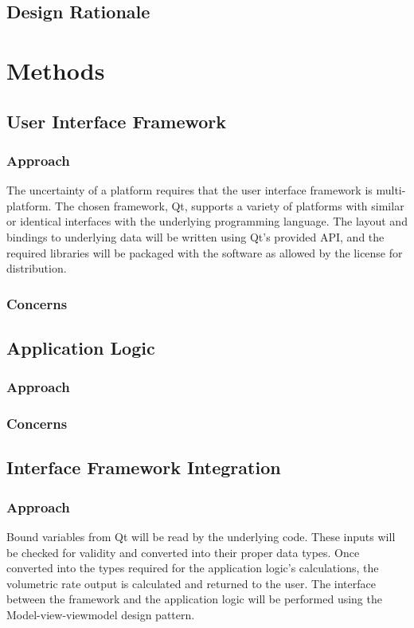 \documentclass[onecolumn, draftclsnofoot,10pt, compsoc]{IEEEtran}
\begin{document}
\subsection{Design Rationale}

\section{Methods}
\subsection{User Interface Framework}
\subsubsection{Approach}
The uncertainty of a platform requires that the user interface framework is multi-platform.
The chosen framework, Qt, supports a variety of platforms with similar or identical interfaces with the underlying programming language.
The layout and bindings to underlying data will be written using Qt's provided API, and the required libraries will be packaged with the software as allowed by the license for distribution. 
\subsubsection{Concerns}

\subsection{Application Logic}
\subsubsection{Approach}

\subsubsection{Concerns}

\subsection{Interface Framework Integration}
\subsubsection{Approach}
Bound variables from Qt will be read by the underlying code.
These inputs will be checked for validity and converted into their proper data types.
Once converted into the types required for the application logic's calculations, the volumetric rate output is calculated and returned to the user.
The interface between the framework and the application logic will be performed using the Model-view-viewmodel design pattern.
\end{document}
